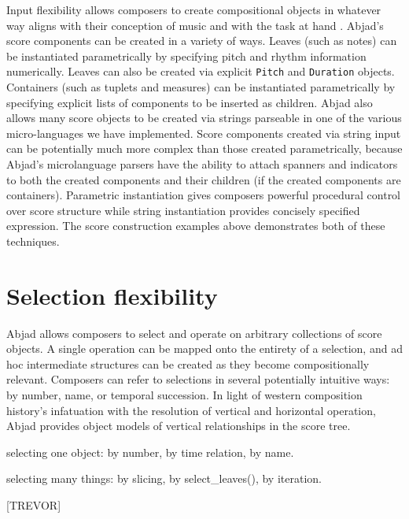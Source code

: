 \documentclass{article}
\begin{document}
Input flexibility allows composers to create compositional objects in whatever
way aligns with their conception of music and with the task at hand
\cite{Kay:1996vn}. Abjad's score components can be created in a variety of
ways. Leaves (such as notes) can be instantiated parametrically by specifying
pitch and rhythm information numerically. Leaves can also be created via
explicit \texttt{Pitch} and \texttt{Duration} objects. Containers (such as
tuplets and measures) can be instantiated parametrically by specifying explicit
lists of components to be inserted as children. Abjad also allows many score
objects to be created via strings parseable in one of the various
micro-languages we have implemented. Score components created via string input
can be potentially much more complex than those created parametrically, because
Abjad's microlanguage parsers have the ability to attach spanners and
indicators to both the created components and their children (if the created
components are containers). Parametric instantiation gives composers powerful
procedural control over score structure while string instantiation provides
concisely specified expression. The score construction examples above
demonstrates both of these techniques.

\section{Selection flexibility} \label{sec:selection-flexibility}

Abjad allows composers to select and operate on arbitrary collections of score
objects. A single operation can be mapped onto the entirety of a selection, and
ad hoc intermediate structures can be created as they become compositionally
relevant. Composers can refer to selections in several potentially intuitive
ways: by number, name, or temporal succession. In light of western composition
history's infatuation with the resolution of vertical and horizontal operation,
Abjad provides object models of vertical relationships in the score tree.

selecting one object: by number, by time relation, by name.

selecting many things: by slicing, by select\_leaves(), by iteration.

[TREVOR]

\end{document}
